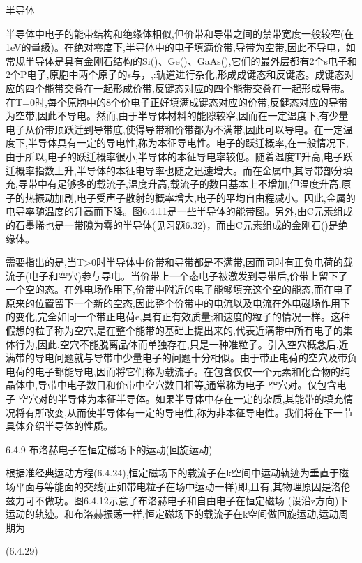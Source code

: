 半导体

半导体中电子的能带结构和绝缘体相似,但价带和导带之间的禁带宽度一般较窄(在1eV的量级)。在绝对零度下,半导体中的电子填满价带,导带为空带,因此不导电，如常规半导体是具有金刚石结构的Si()、Ge()、GaAs(),它们的最外层都有2个s电子和2个P电子,原胞中两个原子的s与，,:轨道进行杂化,形成成键态和反键态。成键态对应的四个能带交叠在一起形成价带,反键态对应的四个能带交叠在一起形成导带。在T=0时,每个原胞中的8个价电子正好填满成键态对应的价带,反健态对应的导带为空带,因此不导电。然而,由于半导体材料的能隙较窄,因而在一定温度下,有少量电子从价带顶跃迁到导带底,使得导带和价带都为不满带,因此可以导电。在一定温度下,半导体具有一定的导电性,称为本征导电性。电子的跃迁概率,在一般情况下,由于所以,电子的跃迁概率很小,半导体的本征导电率较低。随着温度T升高,电子跃迁概率指数上升,半导体的本征电导率也随之迅速增大。而在金属中,其导带部分填充,导带中有足够多的载流子,温度升高,载流子的数目基本上不增加,但温度升高,原子的热振动加剧,电子受声子散射的概率增大,电子的平均自由程减小。因此,金属的电导率随温度的升高而下降。图6.4.11是一些半导体的能带图。另外,由C元素组成的石墨烯也是一带隙为零的半导体(见习题6.32)，而由C元素组成的金刚石()是绝缘体。

需要指出的是,当T>0时半导体中价带和导带都是不满带,因而同时有正负电荷的载流子(电子和空穴)参与导电。当价带上一个态电子被激发到导带后,价带上留下了一个空的态。在外电场作用下,价带中附近的电子能够填充这个空的能态,而在电子原来的位置留下一个新的空态,因此整个价带中的电流以及电流在外电磁场作用下的变化,完全如同一个带正电荷e,具有正有效质量;和速度的粒子的情况一样。这种假想的粒子称为空穴,是在整个能带的基础上提出来的,代表近满带中所有电子的集体行为,因此,空穴不能脱离品体而单独存在,只是一种准粒子。引入空穴概念后,近满带的导电问题就与导带中少量电子的问题十分相似。由于带正电荷的空穴及带负电荷的电子都能导电,因而将它们称为载流子。在包含仅仅一个元素和化合物的纯晶体中,导带中电子数目和价带中空穴数目相等,通常称为电子-空穴对。仅包含电子-空穴对的半导体为本征半导体。如果半导体中存在一定的杂质,其能带的填充情况将有所改变,从而使半导体有一定的导电性,称为非本征导电性。我们将在下一节具体介绍半导体的性质。



6.4.9 布洛赫电子在恒定磁场下的运动(回旋运动)

根据准经典运动方程(6.4.24),恒定磁场下的载流子在k空间中运动轨迹为垂直于磁场平面与等能面的交线(正如带电粒子在场中运动一样)即,且有,其物理原因是洛伦兹力可不做功。图6.4.12示意了布洛赫电子和自由电子在恒定磁场 (设沿z方向)下运动的轨迹。和布洛赫振荡一样,恒定磁场下的载流子在k空间做回旋运动,运动周期为

 	(6.4.29)

